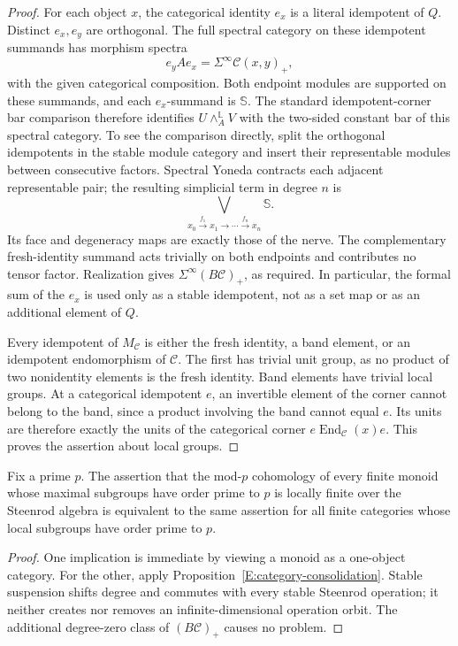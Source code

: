 \begin{proof}
For each object $x$, the categorical identity $e_x$ is a literal
idempotent of $Q$.  Distinct $e_x,e_y$ are orthogonal.  The full
spectral category on these idempotent summands has morphism spectra
\[
 e_y A e_x=\Sigma^\infty\mathcal C(x,y)_+,
\]
with the given categorical composition.  Both endpoint modules are
supported on these summands, and each $e_x$-summand is $\mathbb S$.
The standard idempotent-corner bar comparison therefore identifies
$U\wedge_A^{\mathbb L}V$ with the two-sided constant bar of this
spectral category.  To see the comparison directly, split the
orthogonal idempotents in the stable module category and insert their
representable modules between consecutive factors.  Spectral Yoneda
contracts each adjacent representable pair; the resulting simplicial
term in degree $n$ is
\[
 \bigvee_{x_0\xrightarrow{f_1}x_1\longrightarrow\cdots
                   \xrightarrow{f_n}x_n}\mathbb S.
\]
Its face and degeneracy maps are exactly those of the nerve.  The
complementary fresh-identity summand acts trivially on both endpoints
and contributes no tensor factor.  Realization gives
$\Sigma^\infty(B\mathcal C)_+$, as required.  In particular, the
formal sum of the $e_x$ is used only as a stable idempotent, not as a
set map or as an additional element of $Q$.

Every idempotent of $M_{\mathcal C}$ is either the fresh identity, a
band element, or an idempotent endomorphism of $\mathcal C$.  The first
has trivial unit group, as no product of two nonidentity elements is
the fresh identity.  Band elements have trivial local groups.  At a
categorical idempotent $e$, an invertible element of the corner cannot
belong to the band, since a product involving the band cannot equal
$e$.  Its units are therefore exactly the units of the categorical
corner $e\operatorname{End}_{\mathcal C}(x)e$.  This proves the
assertion about local groups.
\end{proof}

\begin{corollary}\label{E:monoid-category-LF-equivalence}
Fix a prime $p$.  The assertion that the mod-$p$ cohomology of every
finite monoid whose maximal subgroups have order prime to $p$ is
locally finite over the Steenrod algebra is equivalent to the same
assertion for all finite categories whose local subgroups have order
prime to $p$.
\end{corollary}

\begin{proof}
One implication is immediate by viewing a monoid as a one-object
category.  For the other, apply
Proposition~\ref{E:category-consolidation}.  Stable suspension shifts
degree and commutes with every stable Steenrod operation; it neither
creates nor removes an infinite-dimensional operation orbit.  The
additional degree-zero class of $(B\mathcal C)_+$ causes no problem.
\end{proof}

